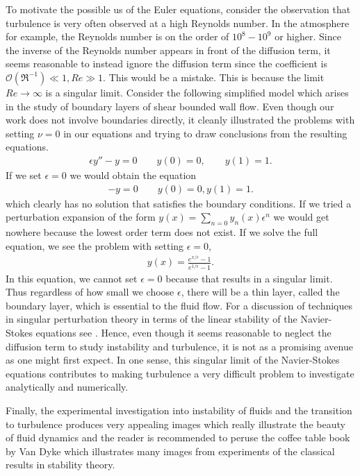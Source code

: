 To motivate the possible us of the Euler equations, consider the observation that turbulence is very often observed at a high Reynolds number. In the atmosphere for example, the Reynolds number is on the order of $10^{8}-10^{9}$ or higher. Since the inverse of the Reynolds number appears in front of the diffusion term, it seems reasonable to instead ignore the diffusion term since the coefficient is $\mathcal{O}(\Re^{-1}) \ll 1, Re\gg 1$. This would be a mistake. This is because the limit $Re\rightarrow\infty$ is a singular limit. Consider the following simplified model which arises in the study of boundary layers of shear bounded wall flow\cite{benderorszag,acheson_fluid,kundu}. Even though our work does not involve boundaries directly, it cleanly illustrated the problems with setting $\nu=0$ in our equations and trying to draw conclusions from the resulting equations.
\begin{align}
\epsilon y'' - y =0 \qquad y(0)=0,\qquad y(1)=1.
\end{align}
If we set $\epsilon=0$ we would obtain the equation 
\begin{align}
- y =0 \qquad y(0)=0,y(1)=1.
\end{align}
which clearly has no solution that satisfies the boundary conditions. If we tried a perturbation expansion of the form $y(x) =\sum_{n=0}y_{n}(x)\epsilon^{n}$ we would get nowhere because the lowest order term does not exist. If we solve the full equation, we see the problem with setting $\epsilon=0$,
\begin{align}
y(x) = \frac{e^{x/\epsilon}-1}{e^{1/\epsilon}-1}.
\end{align}
In this equation, we cannot set $\epsilon=0$ because that results in a singular limit. Thus regardless of how small we choose $\epsilon$, there will be a thin layer, called the boundary layer, which is essential to the fluid flow. For a discussion of techniques in singular perturbation theory in terms of the linear stability of the Navier-Stokes equations see \cite{drazinreid,vandyke}. Hence, even though it seems reasonable to neglect the diffusion term to study instability and turbulence, it is not as a promising avenue as one might first expect. In one sense, this singular limit of the Navier-Stokes equations contributes to making turbulence a very difficult problem to investigate analytically and numerically. 

Finally, the experimental investigation into instability of fluids and the transition to turbulence produces very appealing images which really illustrate the beauty of fluid dynamics and the reader is recommended to peruse the coffee table book by Van Dyke \cite{vandykealbum} which illustrates many images from experiments of the classical results in stability theory. 

